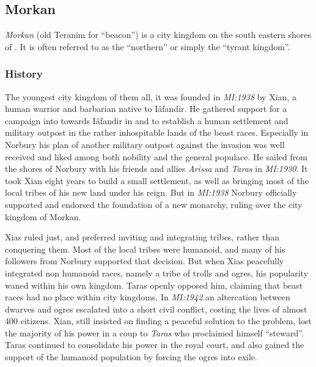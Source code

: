 \subsection{Morkan}
\label{sec:Morkan}


\emph{Morkan} (old Teranim for ``beacon'') is a city kingdom on the south
eastern shores of . It is often referred to as the
``northern'' or simply the ``tyrant kingdom''.

\subsubsection{History}

The youngest city kingdom of them all, it was founded in \emph{MI:1938} by
Xian, a human warrior and barbarian native to Iâfandir. He gathered support
for a campaign into towards Iâfandir in  and
 to establish a human settlement and military outpost in
the rather inhospitable lands of the beast races. Especially in Norbury his
plan of another military outpost against the invasion was well received and
liked among both nobility and the general populace. He sailed from the shores
of Norbury with his friends and allies \emph{Arissa} and \emph{Taras} in
\emph{MI:1930}. It took Xian eight years to build a small settlement, as well
as bringing most of the local tribes of his new land under his reign. But in
\emph{MI:1938} Norbury officially supported and endorsed the foundation of a
new monarchy, ruling over the city kingdom of Morkan.

Xias ruled just, and preferred inviting and integrating tribes, rather than
conquering them. Most of the local tribes were humanoid, and many of his
followers from Norbury supported that decision. But when Xias peacefully
integrated non humanoid races, namely a tribe of trolls and ogres, his
popularity waned within his own kingdom. Taras openly opposed him, claiming
that beast races had no place within city kingdoms. In \emph{MI:1942} an
altercation between dwarves and ogres escalated into a short civil conflict,
costing the lives of almost 400 citizens. Xian, still insisted on finding a
peaceful solution to the problem, lost the majority of his power in a coup to
\emph{Taras} who proclaimed himself ``steward''. Taras continued to
consolidate his power in the royal court, and also gained the support of the
humanoid population by forcing the ogres into exile.

